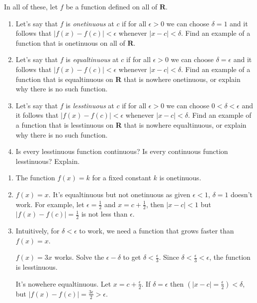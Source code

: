 \documentclass{oxmathproblems}
\begin{document}
\begin{questions}
\miquestion In all of these, let $f$ be a function defined on all of $\textbf{R}$.
\begin{enumerate}[label=(\alph*)]
  \item Let's say that $f$ is \textit{onetinuous} at $c$ if for all $\epsilon > 0$ we can choose $\delta = 1$ and it follows that $|f(x)-f(c)| < \epsilon$
  whenever $|x-c| < \delta$. Find an example of a function that is onetinuous on all of $\textbf{R}$.
  \item Let's say that $f$ is \textit{equaltinuous} at $c$ if for all $\epsilon > 0$ we can choose $\delta = \epsilon$ and it follows that $|f(x)-f(c)| < \epsilon$
  whenever $|x-c| < \delta$. Find an example of a function that is equaltinuous on \textbf{R} that is nowhere onetinuous, or explain why there is no such function.
  \item Let's say that $f$ is \textit{lesstinuous} at $c$ if for all $\epsilon > 0$ we can choose $0 < \delta < \epsilon$ and it follows that $|f(x)-f(c)| < \epsilon$
  whenever $|x-c| < \delta$. Find an example of a function that is lesstinuous on \textbf{R} that is nowhere equaltinuous, or explain why there is no such function.
  \item Is every lesstinuous function continuous? Is every continuous function lesstinuous? Explain.
\end{enumerate}

\begin{solution}
  \begin{enumerate}[label=(\alph*)]
    \item The function $f(x) = k$ for a fixed constant $k$ is onetinuous.
    \item $f(x) = x$. It's equaltinuous but not onetinuous as given $\epsilon < 1$, $\delta = 1$ doesn't work. For example, let $\epsilon=\frac{1}{2}$ and
    $x = c+\frac{1}{2}$, then $|x-c| < 1$ but $|f(x)-f(c)| = \frac{1}{2}$ is not less than $\epsilon$.
    \item Intuitively, for $\delta < \epsilon$ to work, we need a function that grows faster than $f(x)=x$. 
    
    $f(x) = 3x$ works. Solve the $\epsilon-\delta$ to get $\delta < \frac{\epsilon}{3}$. Since $\delta < \frac{\epsilon}{3} < \epsilon$, the function is lesstinuous.

    It's nowehere equaltinuous. Let $x = c+\frac{\epsilon}{2}$. If $\delta=\epsilon$ then $(|x-c| = \frac{\epsilon}{2}) < \delta$, but $|f(x)-f(c)| = \frac{3\epsilon}{2} > \epsilon$.
  

\end{enumerate}
\end{solution}
\end{questions}
\end{document}
